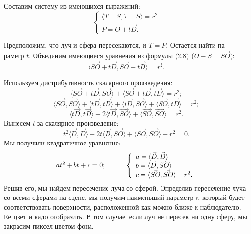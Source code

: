 Составим систему из имеющихся выражений:
\begin{equation}
	\left\{
	\begin{array}{l}
		\langle T - S, T - S \rangle = r^2 \\
		P = O + t \vec{D}.
	\end{array}
	\right.
\end{equation}

Предположим, что луч и сфера пересекаются, и $T=P$. Остается найти па-
раметр $t$.
Объединим имеющиеся уравнения из формулы (2.8) ($O-S=\vec{SO}$):
\begin{equation}
	\langle \vec{SO}+t\vec{D}, \vec{SO}+t\vec{D} \rangle = r^2.
\end{equation}

Используем дистрибутивность скалярного произведения:
\begin{equation}
	\langle \vec{SO}+t\vec{D}, \vec{SO} \rangle + \langle 	\vec{SO}+t\vec{D}, t\vec{D} \rangle = r^2;
\end{equation}
\begin{equation}
	\langle \vec{SO}, \vec{SO} \rangle + \langle t\vec{D}, t\vec{D} \rangle + \langle t\vec{D}, \vec{SO} \rangle + \langle \vec{SO}, t\vec{D} \rangle = r^2;
\end{equation}
\begin{equation}
	\langle t\vec{D}, t\vec{D} \rangle + 2\langle t\vec{D}, \vec{SO} \rangle + \langle \vec{SO}, \vec{SO} \rangle = r^2.
\end{equation}
Вынесем $t$ за скалярное произведение:
\begin{equation}
	t^2\langle \vec{D}, \vec{D} \rangle + 2t\langle \vec{D}, \vec{SO} \rangle + \langle \vec{SO}, \vec{SO} \rangle - r^2 = 0.
\end{equation}
Мы получили квадратичное уравнение:
\begin{equation}
	at^2+bt+c=0; \hspace*{1cm} \\
	\left\{
	\begin{array}{l}
		a=\langle \vec{D}, \vec{D} \rangle \\
		b=\langle \vec{D}, \vec{SO} \rangle \\
		c=\langle \vec{SO}, \vec{SO} \rangle - r^2.
	\end{array}
	\right.
\end{equation}
Решив его, мы найдем пересечение луча со сферой. Определив пересечение луча со всеми сферами на сцене, мы получим наименьший параметр $t$, который будет соответствовать поверхности, расположенной как можно ближе к
наблюдателю. Ее цвет и надо отобразить. В том случае, если луч не пересек ни одну сферу, мы закрасим пиксел цветом фона.

